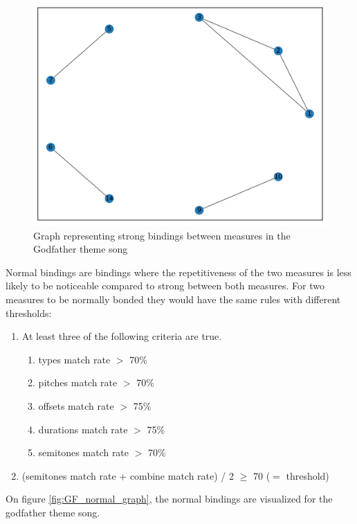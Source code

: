 \begin{figure}
	\includegraphics[width=\linewidth]{Fotos/bindings_graph/Godfather_16_strong.png}
	\caption{Graph representing strong bindings between measures in the Godfather theme song }
	\label{fig:GF_strong_graph}
\end{figure}

Normal bindings are bindings where the repetitiveness of the two measures is less likely to be noticeable compared to strong between both measures. For two measures to be normally bonded they would have the same rules with different thresholds: 
\begin{enumerate}
	\item At least three of the following criteria are true.
			\begin{enumerate}
				\item types match rate $>$ 70\%
				\item pitches match rate $>$ 70\%
				\item offsets match rate $>$ 75\%
				\item durations match rate $>$ 75\%
				\item semitones match rate $>$ 70\%
			\end{enumerate}
	\item (semitones match rate + combine match rate) / 2 $\geq$ 70 ($=$ threshold)
\end{enumerate}

On figure \ref{fig:GF_normal_graph}, the normal bindings are visualized for the godfather theme song.

